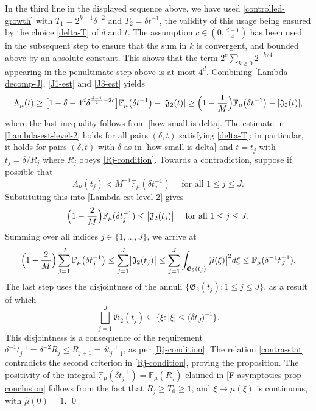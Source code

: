 \documentclass[a4paper,11pt]{amsart}
\numberwithin{equation}{section}
\begin{document}
In the third line in the displayed sequence above, we have used \eqref{controlled-growth} with $T_1 = 2^{k+1} \delta^{-2}$ and $T_2 = \delta t^{-1}$, the validity of this usage being ensured by the choice \eqref{delta-T} of $\delta$ and $t$. The assumption $c \in (0, \frac{d-1}{4})$ has been used in the subsequent step to ensure that the sum in $k$ is convergent, and bounded above by an absolute constant. This shows that the term $2^c \sum_{k\geq 0} 2^{-k/4}$ appearing in the penultimate step above is at most $4^{d}$. Combining \eqref{Lambda-decomp-J}, \eqref{J1-est} and \eqref{J3-est} yields 
\begin{equation} \label{Lambda-est-level-2}
\Lambda_{\mu}(t) \geq \bigl[1 - \delta - 4^d \delta^{\frac{d-1}{2} - 2c} \bigr]  \mathbb F_{\mu} \bigl(\delta t^{-1}\bigr) - |\mathfrak J_2(t)| \geq \Bigl(1 - \frac1M\Bigr)  \mathbb F_{\mu} \bigl(\delta t^{-1}\bigr) - |\mathfrak J_2(t)|,
\end{equation}  
where the last inequality follows from \eqref{how-small-is-delta}. The estimate in \eqref{Lambda-est-level-2} holds for all pairs $(\delta, t)$ satisfying \eqref{delta-T}; in particular, it holds for pairs $(\delta, t)$ with $\delta$ as in \eqref{how-small-is-delta} and $t = t_j$ with $t_j = \delta/R_j$ where $R_j$ obeys \eqref{Rj-condition}.
\vskip0.1in
\noindent Towards a contradiction, suppose if possible that 
\[ \Lambda_{\mu}(t_j) < M^{-1} \mathbb F_{\mu}(\delta t_j^{-1}) \quad \text{ for all $1 \leq j \leq J$.} \]
Substituting this into \eqref{Lambda-est-level-2} gives 
\[ \Bigl(1 - \frac{2}{M}\Bigr)  \mathbb F_{\mu}(\delta t_j^{-1})  \leq \bigl| \mathfrak J_2(t_j) \bigr| \quad \text{ for all $1 \leq j \leq J$.} \] Summing over all indices $j \in \{1, \ldots, J\}$, we arrive at
\begin{equation} \label{contra-stat} 
\Bigl(1 - \frac{2}{M} \Bigr) \sum_{j=1}^{J} \mathbb F_{\mu} \bigl(\delta t_j^{-1}\bigr) \leq \sum_{j=1}^{J} \bigl|\mathfrak J_2(t_j) \bigr| \leq  \sum_{j=1}^{J} \int_{\mathfrak G_{2}(t_j)} \bigl| \widehat{\mu}(\xi) \bigr|^{2} d\xi \leq \mathbb F_{\mu}(\delta^{-1} t_J^{-1}).  
\end{equation} 
The last step uses the disjointness of the annuli $\{\mathfrak G_2(t_j) : 1 \leq j \leq J \}$, as a result of which
\[ \bigsqcup_{j=1}^{J}  \mathfrak G_{2}(t_j) \subseteq \bigl\{\xi : |\xi| \leq \bigl(\delta t_J \bigr)^{-1}  \bigr\}. \]  This disjointness is a consequence of the  requirement $\delta^{-1} t_{j}^{-1} = \delta^{-2} R_j \leq R_{j+1} = \delta t_{j+1}^{-1}$, as per \eqref{Rj-condition}.  The relation \eqref{contra-stat} contradicts the second criterion in \eqref{Rj-condition}, proving the proposition. The positivity of the integral $\mathbb F_{\mu}(\delta t_j^{-1}) = \mathbb F_{\mu}(R_j)$ claimed in \eqref{F-asymptotics-prop-conclusion} follows from the fact that $R_j \geq T_0 \geq 1$, and $\xi \mapsto \widehat{\mu}(\xi)$ is continuous, with $\widehat{\mu}(0) = 1$. 
\qed
\end{document}
